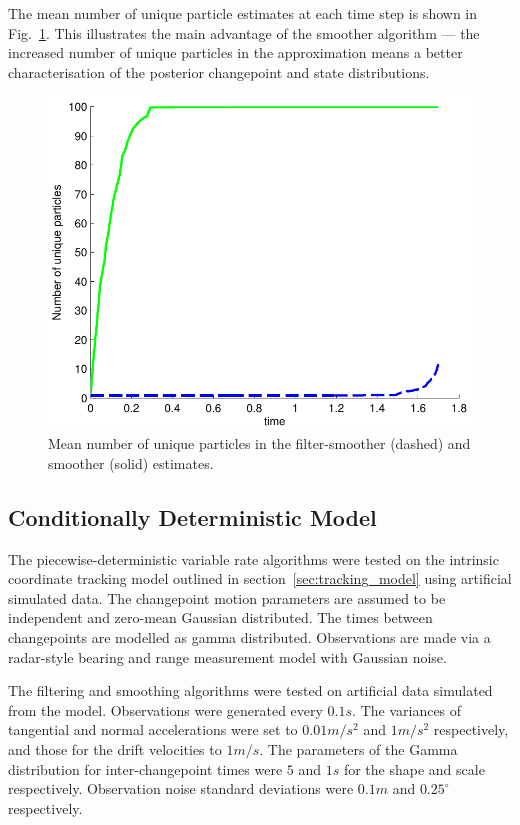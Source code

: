 \documentclass[10pt,twocolumn,twoside]{IEEEtran}
\begin{document}
The mean number of unique particle estimates at each time step is shown in Fig.~\ref{fig:finance_unique_particles}. This illustrates the main advantage of the smoother algorithm --- the increased number of unique particles in the approximation means a better characterisation of the posterior changepoint and state distributions.

\begin{figure}[!t]
\centering
\includegraphics[width=0.75\columnwidth]{finance_unique_particles.pdf}
\caption{Mean number of unique particles in the filter-smoother (dashed) and smoother (solid) estimates.}
\label{fig:finance_unique_particles}
\end{figure}



\subsection{Conditionally Deterministic Model}

The piecewise-deterministic variable rate algorithms were tested on the intrinsic coordinate tracking model outlined in section~\ref{sec:tracking_model} using artificial simulated data. The changepoint motion parameters are assumed to be independent and zero-mean Gaussian distributed. The times between changepoints are modelled as gamma distributed. Observations are made via a radar-style bearing and range measurement model with Gaussian noise.

The filtering and smoothing algorithms were tested on artificial data simulated from the model. Observations were generated every $0.1s$. The variances of tangential and normal accelerations were set to $0.01m/s^2$ and $1m/s^2$ respectively, and those for the drift velocities to $1m/s$. The parameters of the Gamma distribution for inter-changepoint times were $5$ and $1s$ for the shape and scale respectively. Observation noise standard deviations were $0.1m$ and $0.25^{\circ}$ respectively.
\end{document}
